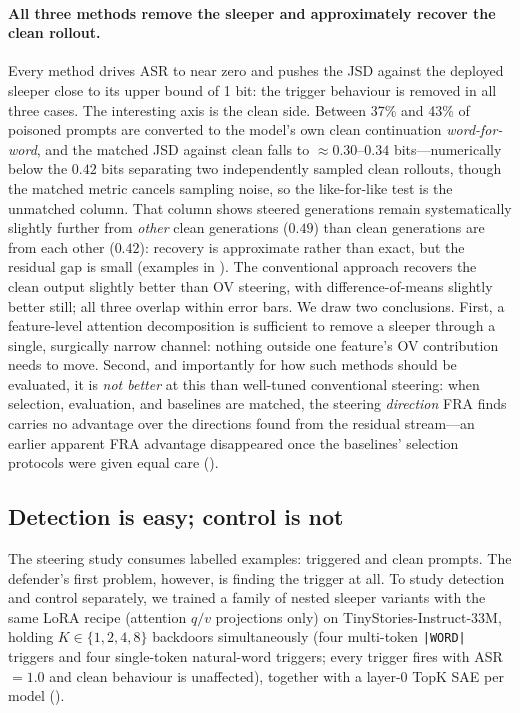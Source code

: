 \documentclass{article}
\theoremstyle{plain}
\theoremstyle{definition}
\theoremstyle{remark}
\begin{document}
\paragraph{All three methods remove the sleeper and approximately recover the clean rollout.} Every method drives ASR to near zero and pushes the JSD against the deployed sleeper close to its upper bound of 1 bit: the trigger behaviour is removed in all three cases. The interesting axis is the clean side. Between 37\% and 43\% of poisoned prompts are converted to the model's own clean continuation \emph{word-for-word}, and the matched JSD against clean falls to ${\approx}0.30$--$0.34$ bits---numerically below the $0.42$ bits separating two independently sampled clean rollouts, though the matched metric cancels sampling noise, so the like-for-like test is the unmatched column. That column shows steered generations remain systematically slightly further from \emph{other} clean generations ($0.49$) than clean generations are from each other ($0.42$): recovery is approximate rather than exact, but the residual gap is small (examples in ). The conventional approach recovers the clean output slightly better than OV steering, with difference-of-means slightly better still; all three overlap within error bars. We draw two conclusions. First, a feature-level attention decomposition is sufficient to remove a sleeper through a single, surgically narrow channel: nothing outside one feature's OV contribution needs to move. Second, and importantly for how such methods should be evaluated, it is \emph{not better} at this than well-tuned conventional steering: when selection, evaluation, and baselines are matched, the steering \emph{direction} FRA finds carries no advantage over the directions found from the residual stream---an earlier apparent FRA advantage disappeared once the baselines' selection protocols were given equal care ().

\subsection{Detection is easy; control is not}
\label{sec:detect_control}
The steering study consumes labelled examples: triggered and clean prompts. The defender's first problem, however, is finding the trigger at all. To study detection and control separately, we trained a family of nested sleeper variants with the same LoRA recipe (attention $q/v$ projections only) on TinyStories-Instruct-33M, holding $K \in \{1,2,4,8\}$ backdoors simultaneously (four multi-token \texttt{|WORD|} triggers and four single-token natural-word triggers; every trigger fires with ASR $=1.0$ and clean behaviour is unaffected), together with a layer-0 TopK SAE per model ().
\end{document}
